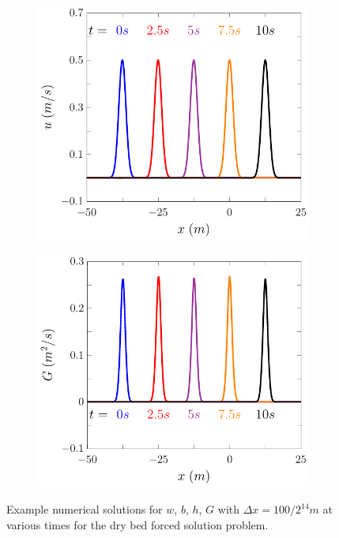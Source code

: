 \documentclass[times]{elsarticle}
\begin{document}
\begin{figure}
\begin{subfigure}{0.5\textwidth}
		\vspace{0.2cm}
	\end{subfigure}
	\begin{subfigure}{0.5\textwidth}
\includegraphics[width=\textwidth]{./Figures/Forced/Dry1/u.pdf}
		\vspace{0.2cm}
	\end{subfigure}%
	\begin{subfigure}{0.5\textwidth}
\includegraphics[width=\textwidth]{./Figures/Forced/Dry1/G.pdf}
		\vspace{0.2cm}
	\end{subfigure}
	\caption{Example numerical solutions for $w$, $b$, $h$, $G$ with $\Delta x = 100 / 2^{14}m$ at various times for the dry bed forced solution problem.}
	\label{fig:ExampleForcedSolutionDry}
\end{figure}
\end{document}
